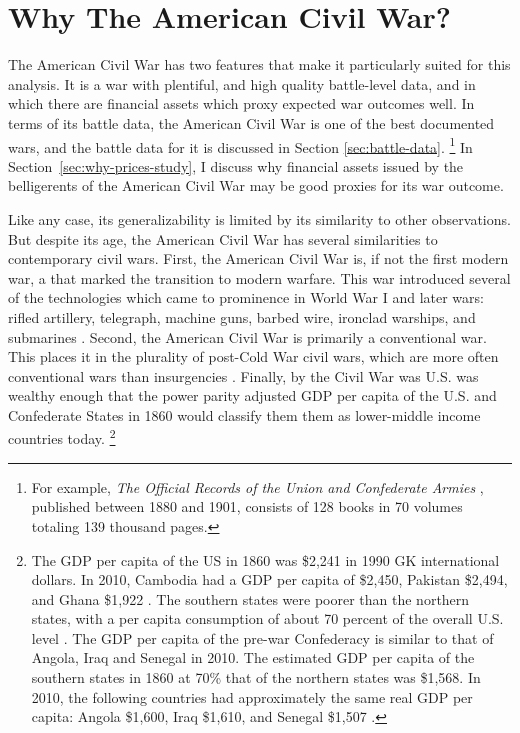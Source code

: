 \section{Why The American Civil War?}
\label{sec:why-american-civil}

The American Civil War has two features that make it particularly suited for this analysis.
It is a war with plentiful, and high quality battle-level data, and in which there are financial assets which proxy expected war outcomes well.
In terms of its battle data, the American Civil War is one of the best documented wars, and the battle data for it is discussed in Section \ref{sec:battle-data}.
\footnote{%
  For example, \textit{The Official Records of the Union and  Confederate Armies} \parencites{US1901}, published between 1880 and 1901, consists of 128 books in 70 volumes totaling 139 thousand pages.

} %
In Section~\ref{sec:why-prices-study}, I discuss why financial assets issued by the belligerents of the American Civil War may be good proxies for its war outcome.

Like any case, its generalizability is limited by its similarity to other observations.
But despite its age, the American Civil War has several similarities to contemporary civil wars.
First, the American Civil War is, if not the first modern war, a that marked the transition to modern warfare.
This war introduced several of the technologies which came to prominence in World War I and later wars: rifled artillery, telegraph, machine guns, barbed wire, ironclad warships, and submarines \parencites[89][]{Fuller1956a}[760]{Weiss1966}.
Second, the American Civil War is primarily a conventional war.
This places it in the plurality of post-Cold War civil wars, which are more often conventional wars than insurgencies \parencite[423]{kalyvas2010inter}. %
Finally, by the Civil War was U.S. was wealthy enough that the power parity adjusted GDP per capita of the U.S. and Confederate States in 1860 would classify them them as lower-middle income countries today.%
\footnote{%
  The GDP per capita of the US in 1860 was \$2,241 in 1990 GK international dollars. %
  In 2010, Cambodia had a GDP per capita of \$2,450, Pakistan \$2,494, and Ghana \$1,922 \parencite{BoltZanden2013}. %
  The southern states were poorer than the northern states, with a per capita consumption of about 70 percent of the overall U.S. level \parencite[324]{GoldinLewis1975}.
  The GDP per capita of the pre-war Confederacy is similar to that of Angola, Iraq and Senegal in 2010.%
  The estimated GDP per capita of the southern states in 1860 at 70\% that of the northern states was \$1,568. %
  In 2010, the following countries had approximately the same real GDP per capita: Angola \$1,600, Iraq \$1,610, and Senegal \$1,507 \parencite{BoltZanden2013}. %
}

